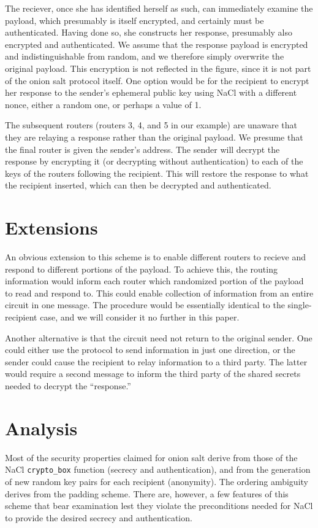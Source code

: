 \documentclass[letterpaper,twocolumn,amsmath,amssymb,pre,aps,10pt]{revtex4-1}
\begin{document}
The reciever, once she has identified herself as such, can immediately
examine the payload, which presumably is itself encrypted, and
certainly must be authenticated.  Having done so, she constructs her
response, presumably also encrypted and authenticated.  We assume that
the response payload is encrypted and indistinguishable from random,
and we therefore simply overwrite the original payload.  This
encryption is not reflected in the figure, since it is not part of the
onion salt protocol itself.  One option would be for the recipient to
encrypt her response to the sender's ephemeral public key using NaCl
with a different nonce, either a random one, or perhaps a value of 1.

The subsequent routers (routers 3, 4, and 5 in our example) are
unaware that they are relaying a response rather than the original
payload.  We presume that the final router is given the sender's
address.  The sender will decrypt the response by encrypting it (or
decrypting without authentication) to each of the keys of the routers
following the recipient.  This will restore the response to what the
recipient inserted, which can then be decrypted and authenticated.

\section{Extensions}

An obvious extension to this scheme is to enable different routers to
recieve and respond to different portions of the payload.  To achieve
this, the routing information would inform each router which
randomized portion of the payload to read and respond to. This could
enable collection of information from an entire circuit in one
message.  The procedure would be essentially identical to the
single-recipient case, and we will consider it no further in this
paper.

Another alternative is that the circuit need not return to the
original sender.  One could either use the protocol to send
information in just one direction, or the sender could cause the
recipient to relay information to a third party.  The latter would
require a second message to inform the third party of the shared
secrets needed to decrypt the ``response.''

\section{Analysis}

Most of the security properties claimed for onion salt derive from
those of the NaCl \texttt{crypto\_box} function (secrecy and
authentication), and from the generation of new random key pairs for
each recipient (anonymity).  The ordering ambiguity derives from the
padding scheme.  There are, however, a few features of this scheme
that bear examination lest they violate the preconditions needed for
NaCl to provide the desired secrecy and authentication.
\end{document}
